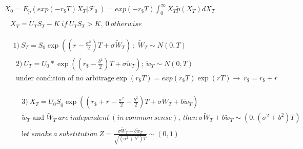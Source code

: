 \documentclass[12pt, a4paper]{article}
\begin{document}
\begin{enumerate}
\[\begin{matrix}
X_{0} = E_{\tilde{p}}\left( exp\left( - r_{\$}T \right)X_{T}\left| \mathcal{F}_{0} \right.\  \right) = exp\left( - r_{\$}T \right)\int_{0}^{\infty}{X_{T}\tilde{p}\left( X_{T} \right)}dX_{T} \\
\begin{matrix}
\begin{matrix}
X_{T} = U_{T}S_{T} - K\ if\ U_{T}S_{T} > K,\ 0\ otherwise \\
\end{matrix} \\
\begin{matrix}
\begin{matrix}
1)\ S_{T} = S_{0}\exp\left( \left( r_{} - \frac{\sigma^{2}}{2} \right)T + \sigma{\tilde{W}}_{T} \right)\ ;\ {\tilde{W}}_{T}\sim N\left( 0,T \right)\  \\
\begin{matrix}
2)\ U_{T} = U_{0}*\exp\left( \left( r_{\$} - \frac{b^{2}}{2} \right)T + \sigma{\tilde{w}}_{T} \right);\ {\tilde{w}}_{T}\sim N\left( 0,T \right)\  \\
\text{under\ condition\ of\ no\ arbitrage}\exp\left( r_{\$}T \right) = exp\left( r_{\$}T \right)\exp\left( r_{}T \right) \rightarrow \ r_{\$} = r_{\$} + r_{} \\
\end{matrix}\  \\
\begin{matrix}
\begin{matrix}
\begin{matrix}
3)\ X_{T} = {U_{0}S}_{0}\exp\left( \left( r_{\$} + r_{} - \frac{\sigma^{2}}{2} - \frac{b^{2}}{2} \right)T + \sigma{\tilde{W}}_{T} + b{\tilde{w}}_{T} \right)\  \\
{\tilde{w}}_{T}\text{\ and\ }{\tilde{W}}_{T}\ are\ independent\ (in\ common\ sense),\ then\ \sigma{\tilde{W}}_{T} + b{\tilde{w}}_{T}\sim\left( 0,\left( \sigma^{2} + b^{2} \right)T \right) \\
\text{le}t^{'}smake\ a\ substitution\ Z = \frac{\sigma{\tilde{W}}_{T} + b{\tilde{w}}_{T}}{\sqrt{\left( \sigma^{2} + b^{2} \right)T}}\sim\left( 0,1 \right) \\
\end{matrix} \\
\end{matrix} \\
\end{matrix} \\
\end{matrix} \\

\end{matrix}
\end{matrix}
\end{matrix}\]
\end{enumerate}
\end{document}
